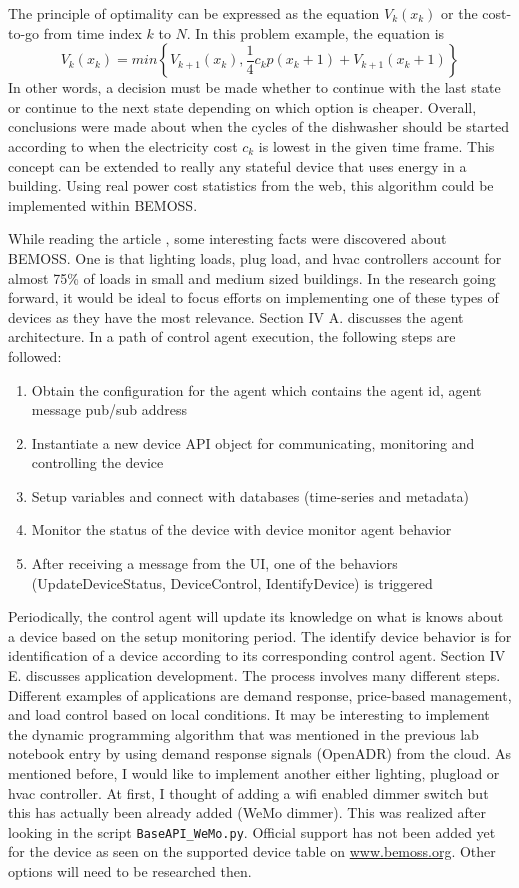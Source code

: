 \documentclass[fontsize=11pt, %
                             paper=letter, %
                             twoside, %
                             captions=tableheading,
                             index=totoc,
                             hyperref]{labbook}
\begin{document}
\begin{addmargin}[0cm]{0cm}
The principle of optimality can be expressed as the equation $V_k(x_k)$ or the cost-to-go from time index $k$ to $N$. In this problem example, the equation is
\[ 
	V_k(x_k)=min\left\{V_{k+1}(x_k), \frac{1}{4}c_kp(x_k+1)+V_{k+1}(x_k+1)\right\}
\]
In other words, a decision must be made whether to continue with the last state or continue to the next state depending on which option is cheaper. Overall, conclusions were made about when the cycles of the dishwasher should be started according to when the electricity cost $c_k$ is lowest in the given time frame. This concept can be extended to really any stateful device that uses energy in a building. Using real power cost statistics from the web, this algorithm could be implemented within BEMOSS.

While reading the article \cite{khamphanchai2015}, some interesting facts were discovered about BEMOSS. One is that lighting loads, plug load, and hvac controllers account for almost 75\% of loads in small and medium sized buildings. In the research going forward, it would be ideal to focus efforts on implementing one of these types of devices as they have the most relevance. Section IV A. discusses the agent architecture. In a path of control agent execution, the following steps are followed:
\begin{enumerate}
\item Obtain the configuration for the agent which contains the agent id, agent message pub/sub address
\item Instantiate a new device API object for communicating, monitoring and controlling the device
\item Setup variables and connect with databases (time-series and metadata)
\item Monitor the status of the device with device monitor agent behavior
\item After receiving a message from the UI, one of the behaviors (UpdateDeviceStatus, DeviceControl, IdentifyDevice) is triggered
\end{enumerate}
Periodically, the control agent will update its knowledge on what is knows about a device based on the setup monitoring period. The identify device behavior is for identification of a device according to its corresponding control agent. Section IV E. discusses application development. The process involves many different steps. Different examples of applications are demand response, price-based management, and load control based on local conditions. It may be interesting to implement the dynamic programming algorithm that was mentioned in the previous lab notebook entry by using demand response signals (OpenADR) from the cloud. As mentioned before, I would like to implement another either lighting, plugload or hvac controller.  At first, I thought of adding a wifi enabled dimmer switch but this has actually been already added (WeMo dimmer). This was realized after looking in the script \texttt{BaseAPI\_WeMo.py}. Official support has not been added yet for the device as seen on the supported device table on \url{www.bemoss.org}. Other options will need to be researched then.

\end{addmargin}
\end{document}
